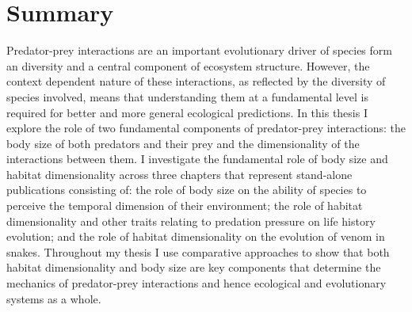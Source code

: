 \chapter*{Summary}

Predator-prey interactions are an important evolutionary driver of species form an diversity and a central component of ecosystem structure. However, the context dependent nature of these interactions, as reflected by the diversity of species involved, means that understanding them at a fundamental level is required for better and more general ecological predictions. In this thesis I explore the role of two fundamental components of predator-prey interactions: the body size of both predators and their prey and the dimensionality of the interactions between them. I investigate the fundamental role of body size and habitat dimensionality across three chapters that represent stand-alone publications consisting of: the role of body size on the ability of species to perceive the temporal dimension of their environment; the role of habitat dimensionality and other traits relating to predation pressure on life history evolution; and the role of habitat dimensionality on the evolution of venom in snakes. Throughout my thesis I use comparative approaches to show that both habitat dimensionality and body size are key components that determine the mechanics of predator-prey interactions and hence ecological and evolutionary systems as a whole.

